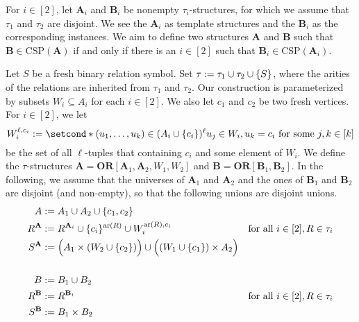 \documentclass[a4paper,english, thm-restate]{lipics-v2021}
\DeclarePairedDelimiter\set{\lbrace}{\rbrace}
\newcommand{\sig}{\tau}
\newcommand{\arity}[1]{\operatorname*{ar}(#1)}
\newcommand{\StructA}{\mathbf{A}}
\newcommand{\StructB}{\mathbf{B}}
\newcommand{\CSP}[1]{\mathrm{CSP}(#1)}
\newcommand{\ORparam}[1]{\mathbf{OR}[#1]}
\newcommand{\OR}[1]{\mathbf{OR}[#1]}
\begin{document}
	For $i \in [2]$, let $\StructA_i$ and $\StructB_i$ be nonempty $\sig_i$-structures,
	for which we assume that $\sig_1$ and $\sig_2$ are disjoint.
	We see the $\StructA_i$ as template structures and the $\StructB_i$ as the corresponding instances.
	We aim to define two structures $\StructA$ and $\StructB$ such that $\StructB \in \CSP{\StructA}$ if and only if there is an $i \in [2]$ such that $\StructB_i \in \CSP{\StructA_i}$.
	
	
	
	Let $S$ be a fresh binary relation symbol.
	Set $\sig := \sig_1 \cup \sig_2 \cup \set{S}$,
	where the arities of the relations are inherited from $\sig_1$ and $\sig_2$.
	Our construction is parameterized by subsets $W_i \subseteq A_i$ for each $i\in[2]$.
	We also let $c_1$ and $c_2$ be two fresh vertices.
	For $i\in[2]$, 
	we let 
	\[W_i^{\ell,c_i} := \setcond*{(u_1,\dots,u_k)\in (A_i\cup\set{c_i})^\ell}{u_j \in W_i, u_k = c_i \text{ for some } j,k \in [k]}\]
	be the set of all $\ell$-tuples that containing $c_i$ and some element of $W_i$.
	We define the $\sig$-structures $\StructA = \ORparam{\StructA_1,\StructA_2,W_1,W_2}$ and 
	$\StructB = \OR{\StructB_1,\StructB_2}$.
	In the following, we assume that the universes of $\StructA_1$ and $\StructA_2$
	and the ones of $\StructB_1$ and $\StructB_2$ are disjoint (and non-empty), so that
	the following unions are disjoint unions.
	\begin{align*}
		A &:= A_1 \cup A_2 \cup \set{c_1,c_2}\\
		R^\StructA & :=R^{\StructA_i}  \cup   \set{c_i}^{\arity{R}} \cup W_i^{\arity{R}, c_i} & \text{for all } i \in [2], R \in \sig_i\\
		S^\StructA & :=  \Big( A_1 \times (W_2 \cup \set{c_{2}})\Big)
		\cup \Big( (W_1 \cup \set{c_1}) \times A_{2}\Big)\\\\
		B &:= B_1 \cup B_2\\
		R^\StructB &:= R^{\StructB_i}  & \text{for all } i \in [2], R \in \sig_i\\
		S^\StructB &:= B_1 \times B_2
	\end{align*}
	
\end{document}
